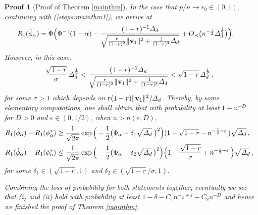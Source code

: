 \documentclass[12pt]{article}
\numberwithin{equation}{section}
\newtheorem{myPro}{Proof}
\theoremstyle{remark}
\newcommand{\1}{{\rm 1}\kern-0.24em{\rm I}}
\begin{document}
\begin{myPro} [Proof of  Theorem \ref{mainthm}]
{In the case that $p/n\to r_0\in (0,1)$, continuing with (\ref{steps:mainthm1}),  we arrive at 
\begin{align*}
R_1(\hat{\phi}_\alpha) &= \Phi\Big( \Phi^{-1}(1-\alpha) -\frac{(1-r)^{-1}\varDelta_d }{\sqrt{\frac{r}{(1-r)^2}\Vert {\bf v}_1\Vert^2 + \frac{1}{(1-r)^3} \varDelta_d}} + O_\prec\big(n^{-\frac 12} \varDelta_d^{\frac 12} \big)\Big).
\end{align*}
However, in this case, 
 $$\frac{\sqrt{1-r}}{\sigma} \, \varDelta_d^{\frac 12} < \frac{(1-r)^{-1}\varDelta_d }{\sqrt{\frac{r}{(1-r)^2}\Vert {\bf v}_1\Vert^2 + \frac{1}{(1-r)^3} \varDelta_d}}  <\sqrt{1-r}  \, \varDelta_d^{\frac 12}\, , $$
  for some $\sigma>1$ which depends on $r(1-r)\Vert {\bf v}_1\Vert^2/ \varDelta_d$. Thereby, by some elementary computations, one shall obtain that with probability at least  $1-n^{-D}$ for $D>0$ and $\varepsilon\in (0,1/2)$, when $n>n(\varepsilon, D)$, 
 \begin{align*}
&R_1(\hat{\phi}_\alpha) - R_1({\phi}_\alpha^*)\geq \frac{1}{\sqrt {2\pi }} \exp\Big( -\frac 12 \big(\Phi_\alpha - \delta_1 \sqrt{\varDelta_d}\; \big)^2\Big)  (1-\sqrt{1-r} - n^{-\frac{1}{2}+ \varepsilon}\, )\sqrt{\varDelta_d} \,, \notag\\
&R_1(\hat{\phi}_\alpha) - R_1({\phi}_\alpha^*) \leq \frac{1}{\sqrt {2\pi }} \exp\Big( -\frac 12 \big(\Phi_\alpha - \delta_2 \sqrt{\varDelta_d}\, \big)^2\Big)  \Big(1-\frac{\sqrt{1-r}}{\sigma}+ n^{-\frac{1}{2}+ \varepsilon}\, \Big)\sqrt{\varDelta_d} \,,
 \end{align*}
for some $\delta_1\in (\sqrt{1-r}, 1)$ and $\delta_2\in (\sqrt{1-r}/\sigma, 1)$.


Combining the loss of probability for both statements together, eventually we see that (i) and (ii) hold with probability at least $1- \delta - C_1 n^{-\frac 12+ \varepsilon}  - C_2 n^{-D}$ and hence we finished the proof of Theorem \ref{mainthm}.

}
\end{myPro}

%
%
\end{document}

